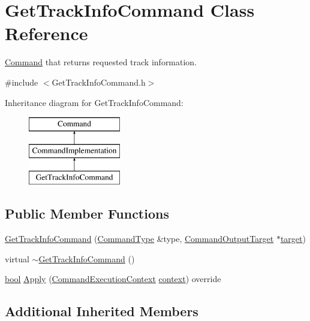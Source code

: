 \hypertarget{class_get_track_info_command}{}\section{Get\+Track\+Info\+Command Class Reference}
\label{class_get_track_info_command}


\hyperlink{class_command}{Command} that returns requested track information.  




{\ttfamily \#include $<$Get\+Track\+Info\+Command.\+h$>$}

Inheritance diagram for Get\+Track\+Info\+Command\+:\begin{figure}[H]
\begin{center}
\leavevmode
\includegraphics[height=3.000000cm]{class_get_track_info_command}
\end{center}
\end{figure}
\subsection*{Public Member Functions}
\begin{DoxyCompactItemize}
\item 
\hyperlink{class_get_track_info_command_a9664ca127a5e0dcc2aa26ebb63f9459b}{Get\+Track\+Info\+Command} (\hyperlink{class_command_type}{Command\+Type} \&type, \hyperlink{class_command_output_target}{Command\+Output\+Target} $\ast$\hyperlink{lib_2expat_8h_a15a257516a87decb971420e718853137}{target})
\item 
virtual \hyperlink{class_get_track_info_command_aeaeec942ab5b0e99233d120bff3ff137}{$\sim$\+Get\+Track\+Info\+Command} ()
\item 
\hyperlink{mac_2config_2i386_2lib-src_2libsoxr_2soxr-config_8h_abb452686968e48b67397da5f97445f5b}{bool} \hyperlink{class_get_track_info_command_a645806704e89af5cfea10f73053fb7e6}{Apply} (\hyperlink{class_command_execution_context}{Command\+Execution\+Context} \hyperlink{structcontext}{context}) override
\end{DoxyCompactItemize}
\subsection*{Additional Inherited Members}


